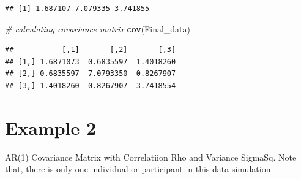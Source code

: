 \documentclass[
]{book}
\newenvironment{Shaded}{\begin{snugshade}}{\end{snugshade}}
\newcommand{\CommentTok}[1]{\textcolor[rgb]{0.56,0.35,0.01}{\textit{#1}}}
\newcommand{\ControlFlowTok}[1]{\textcolor[rgb]{0.13,0.29,0.53}{\textbf{#1}}}
\newcommand{\DecValTok}[1]{\textcolor[rgb]{0.00,0.00,0.81}{#1}}
\newcommand{\FloatTok}[1]{\textcolor[rgb]{0.00,0.00,0.81}{#1}}
\newcommand{\KeywordTok}[1]{\textcolor[rgb]{0.13,0.29,0.53}{\textbf{#1}}}
\newcommand{\NormalTok}[1]{#1}
\newcommand{\OperatorTok}[1]{\textcolor[rgb]{0.81,0.36,0.00}{\textbf{#1}}}
\newcommand{\StringTok}[1]{\textcolor[rgb]{0.31,0.60,0.02}{#1}}
\begin{document}
\begin{verbatim}
## [1] 1.687107 7.079335 3.741855
\end{verbatim}

\begin{Shaded}
\begin{Highlighting}[]
\CommentTok{# calculating covariance matrix}
\KeywordTok{cov}\NormalTok{(Final_data)}
\end{Highlighting}
\end{Shaded}

\begin{verbatim}
##           [,1]       [,2]       [,3]
## [1,] 1.6871073  0.6835597  1.4018260
## [2,] 0.6835597  7.0793350 -0.8267907
## [3,] 1.4018260 -0.8267907  3.7418554
\end{verbatim}

\hypertarget{example-2}{%
\section{Example 2}\label{example-2}}

AR(1) Covariance Matrix with Correlatiion Rho and Variance SigmaSq. Note that, there is only one individual or participant in this data simulation.

\begin{Shaded}
\end{Shaded}
\end{document}
